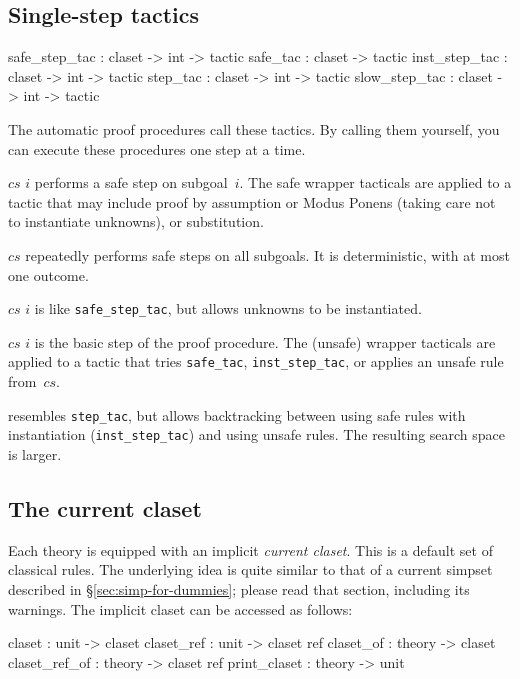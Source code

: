 \subsection{Single-step tactics}
\begin{ttbox} 
safe_step_tac : claset -> int -> tactic
safe_tac      : claset        -> tactic
inst_step_tac : claset -> int -> tactic
step_tac      : claset -> int -> tactic
slow_step_tac : claset -> int -> tactic
\end{ttbox}
The automatic proof procedures call these tactics.  By calling them
yourself, you can execute these procedures one step at a time.
\begin{ttdescription}
\item[\ttindexbold{safe_step_tac} $cs$ $i$] performs a safe step on
  subgoal~$i$.  The safe wrapper tacticals are applied to a tactic that may
  include proof by assumption or Modus Ponens (taking care not to instantiate
  unknowns), or substitution.

\item[\ttindexbold{safe_tac} $cs$] repeatedly performs safe steps on all 
subgoals.  It is deterministic, with at most one outcome.  

\item[\ttindexbold{inst_step_tac} $cs$ $i$] is like \texttt{safe_step_tac},
but allows unknowns to be instantiated.

\item[\ttindexbold{step_tac} $cs$ $i$] is the basic step of the proof
  procedure.  The (unsafe) wrapper tacticals are applied to a tactic that tries
 \texttt{safe_tac}, \texttt{inst_step_tac}, or applies an unsafe rule from~$cs$.

\item[\ttindexbold{slow_step_tac}] 
  resembles \texttt{step_tac}, but allows backtracking between using safe
  rules with instantiation (\texttt{inst_step_tac}) and using unsafe rules.
  The resulting search space is larger.
\end{ttdescription}

\subsection{The current claset}\label{sec:current-claset}

Each theory is equipped with an implicit \emph{current
  claset}.  This is a default set of classical
rules.  The underlying idea is quite similar to that of a current
simpset described in \S\ref{sec:simp-for-dummies}; please read that
section, including its warnings.  The implicit claset can be accessed
as follows:
\begin{ttbox}
claset        : unit -> claset
claset_ref    : unit -> claset ref
claset_of     : theory -> claset
claset_ref_of : theory -> claset ref
print_claset  : theory -> unit
\end{ttbox}

